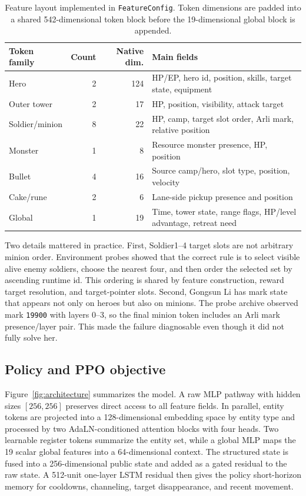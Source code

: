 \documentclass{article}
\begin{document}
\begin{table}[t]
  \centering
  \caption{Feature layout implemented in \texttt{FeatureConfig}. Token dimensions are padded into a shared 542-dimensional token block before the 19-dimensional global block is appended.}
  \label{tab:feature-layout}
  \small
  \begin{tabular}{lrrl}
    \toprule
    Token family & Count & Native dim. & Main fields \\
    \midrule
    Hero & 2 & 124 & HP/EP, hero id, position, skills, target state, equipment \\
    Outer tower & 2 & 17 & HP, position, visibility, attack target \\
    Soldier/minion & 8 & 22 & HP, camp, target slot order, Arli mark, relative position \\
    Monster & 1 & 8 & Resource monster presence, HP, position \\
    Bullet & 4 & 16 & Source camp/hero, slot type, position, velocity \\
    Cake/rune & 2 & 6 & Lane-side pickup presence and position \\
    Global & 1 & 19 & Time, tower state, range flags, HP/level advantage, retreat need \\
    \bottomrule
  \end{tabular}
\end{table}

Two details mattered in practice. First, Soldier1--4 target slots are not arbitrary minion order. Environment probes showed that the correct rule is to select visible alive enemy soldiers, choose the nearest four, and then order the selected set by ascending runtime id. This ordering is shared by feature construction, reward target resolution, and target-pointer slots. Second, Gongsun Li has mark state that appears not only on heroes but also on minions. The probe archive observed mark \texttt{19900} with layers 0--3, so the final minion token includes an Arli mark presence/layer pair. This made the failure diagnosable even though it did not fully solve her.

\subsection{Policy and PPO objective}

Figure~\ref{fig:architecture} summarizes the model. A raw MLP pathway with hidden sizes $[256,256]$ preserves direct access to all feature fields. In parallel, entity tokens are projected into a 128-dimensional embedding space by entity type and processed by two AdaLN-conditioned attention blocks with four heads. Two learnable register tokens summarize the entity set, while a global MLP maps the 19 scalar global features into a 64-dimensional context. The structured state is fused into a 256-dimensional public state and added as a gated residual to the raw state. A 512-unit one-layer LSTM residual then gives the policy short-horizon memory for cooldowns, channeling, target disappearance, and recent movement.
\end{document}
